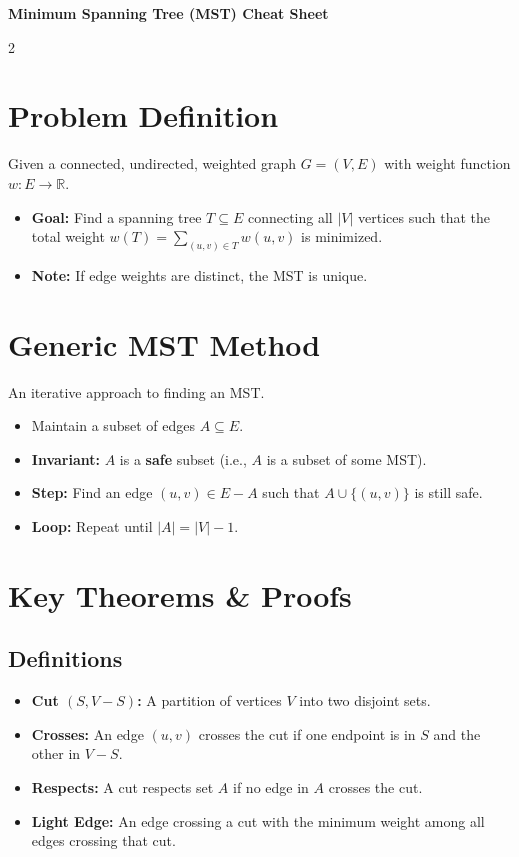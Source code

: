\documentclass[10pt, a4paper]{article}
\begin{document}
\begin{center}
    {\Huge \textbf{Minimum Spanning Tree (MST) Cheat Sheet}}
\end{center}

\begin{multicols*}{2}

\section{Problem Definition}
Given a connected, undirected, weighted graph $G = (V, E)$ with weight function $w: E \rightarrow \mathbb{R}$.
\begin{itemize}[leftmargin=*]
    \item \textbf{Goal:} Find a spanning tree $T \subseteq E$ connecting all $|V|$ vertices such that the total weight $w(T) = \sum_{(u,v) \in T} w(u,v)$ is minimized.
    \item \textbf{Note:} If edge weights are distinct, the MST is unique.
\end{itemize}

\section{Generic MST Method}
An iterative approach to finding an MST.
\begin{itemize}[leftmargin=*]
    \item Maintain a subset of edges $A \subseteq E$.
    \item \textbf{Invariant:} $A$ is a \textbf{safe} subset (i.e., $A$ is a subset of some MST).
    \item \textbf{Step:} Find an edge $(u, v) \in E - A$ such that $A \cup \{(u, v)\}$ is still safe.
    \item \textbf{Loop:} Repeat until $|A| = |V| - 1$.
\end{itemize}

\section{Key Theorems \& Proofs}

\subsection{Definitions}
\begin{itemize}[leftmargin=*]
    \item \textbf{Cut $(S, V-S)$:} A partition of vertices $V$ into two disjoint sets.
    \item \textbf{Crosses:} An edge $(u, v)$ crosses the cut if one endpoint is in $S$ and the other in $V-S$.
    \item \textbf{Respects:} A cut respects set $A$ if no edge in $A$ crosses the cut.
    \item \textbf{Light Edge:} An edge crossing a cut with the minimum weight among all edges crossing that cut.
\end{itemize}


\end{multicols*}
\end{document}
